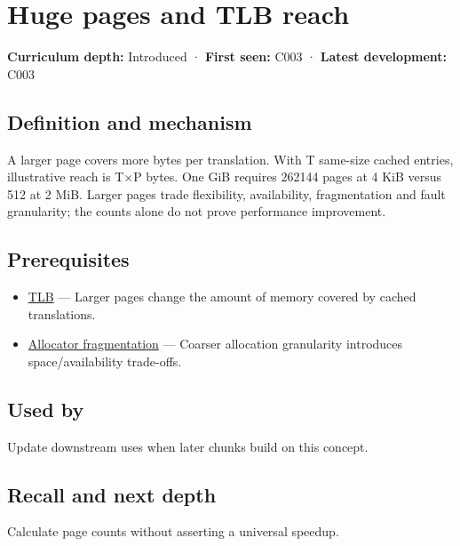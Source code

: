 \hypertarget{appendix-ce688d1acdab}{}
\section{Huge pages and TLB reach}\label{appendix-ce688d1acdab-huge-pages-and-tlb-reach}

\textbf{Curriculum depth:} Introduced · \textbf{First seen:} C003 · \textbf{Latest development:} C003

\subsection{Definition and mechanism}\label{appendix-ce688d1acdab-definition-and-mechanism}

A larger page covers more bytes per translation. With T same-size cached entries, illustrative reach is T×P bytes. One GiB requires 262144 pages at 4 KiB versus 512 at 2 MiB. Larger pages trade flexibility, availability, fragmentation and fault granularity; the counts alone do not prove performance improvement.

\subsection{Prerequisites}\label{appendix-ce688d1acdab-prerequisites}

\begin{itemize}
\tightlist
\item
  \hyperref[appendix-7a2d9c5ce511]{TLB} --- Larger pages change the amount of memory covered by cached translations.
\item
  \hyperref[appendix-a7c50686d81f]{Allocator fragmentation} --- Coarser allocation granularity introduces space/availability trade-offs.
\end{itemize}

\subsection{Used by}\label{appendix-ce688d1acdab-used-by}

Update downstream uses when later chunks build on this concept.

\subsection{Recall and next depth}\label{appendix-ce688d1acdab-recall-and-next-depth}

Calculate page counts without asserting a universal speedup.

